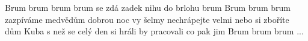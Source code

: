 \begin{TEXT}{Brum brum brum}
\SLOKA {} brum 
 se zdá 
 zadek nihu
 do brlohu
 brum 
\SLOKA Brum brum brum
zazpíváme medvědům
dobrou noc vy šelmy
nechrápejte velmi
nebo si zboříte dům
\SLOKA {} Kuba s 
 než se 
celý den si hráli
 by pracovali
 co pak jim 
\SLOKA Brum brum brum ...
\end{TEXT}